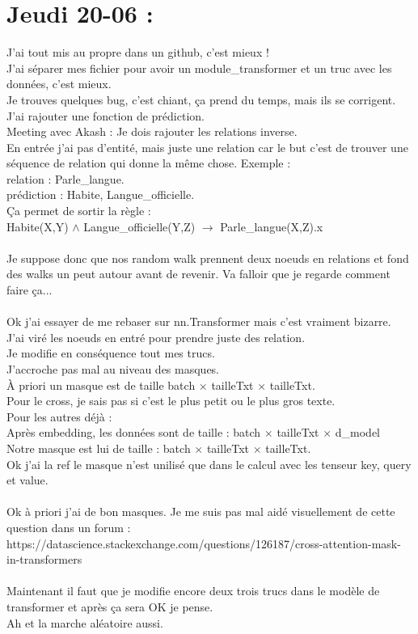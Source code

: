 \documentclass{article}
\begin{document}
\section*{Jeudi 20-06 :}
J'ai tout mis au propre dans un github, c'est mieux !\\
J'ai séparer mes fichier pour avoir un module\_transformer et un truc avec les données, c'est mieux.\\
Je trouves quelques bug, c'est chiant, ça prend du temps, mais ils se corrigent.\\
J'ai rajouter une fonction de prédiction.\\
Meeting avec Akash : Je dois rajouter les relations inverse.\\
En entrée j'ai pas d'entité, mais juste une relation car le but c'est de trouver une séquence de relation qui donne la même chose. Exemple :\\
relation : Parle\_langue.\\
prédiction : Habite, Langue\_officielle.\\
Ça permet de sortir la règle :\\
Habite(X,Y) $\wedge$ Langue\_officielle(Y,Z) $\to$ Parle\_langue(X,Z).x\\
\\
Je suppose donc que nos random walk prennent deux noeuds     en relations et fond des walks un peut autour avant de revenir. Va falloir que je regarde comment faire ça...\\
\\
Ok j'ai essayer de me rebaser sur nn.Transformer mais c'est vraiment bizarre.\\
J'ai viré les noeuds en entré pour prendre juste des relation.\\
Je modifie en conséquence tout mes trucs.\\
J'accroche pas mal au niveau des masques.\\
À priori un masque est de taille batch $\times$ tailleTxt $\times$ tailleTxt.\\
Pour le cross, je sais pas si c'est le plus petit ou le plus gros texte.\\
Pour les autres déjà : \\
Après embedding, les données sont de taille : batch $\times$ tailleTxt $\times$ d\_model\\
Notre masque est lui de taille : batch $\times$ tailleTxt $\times$ tailleTxt.\\
Ok j'ai la ref le masque n'est unilisé que dans le calcul avec les tenseur key, query et value.\\
\\
Ok à priori j'ai de bon masques. Je me suis pas mal aidé visuellement de cette question dans un forum :\\
https://datascience.stackexchange.com/questions/126187/cross-attention-mask-in-transformers\\
\\
Maintenant il faut que je modifie encore deux trois trucs dans le modèle de transformer et après ça sera OK je pense.\\
Ah et la marche aléatoire aussi.
\end{document}
